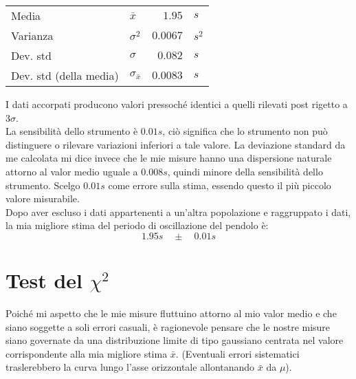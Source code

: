 \documentclass{article}
\begin{document}
	\vspace{0.8cm}
	\begin{table}[H]
		\centering
		\begin{tabular}{llrl}
			Media                       & $\bar{x}$             & $1.95$        & $s$       \\
			Varianza                    & $\sigma ^ 2$          & $0.0067$     & $s^2$  \\
			Dev. std                    & $\sigma$              & $0.082$      & $s$   \\
			Dev. std (della media)      & $\sigma_{\bar{x}}$    & $0.0083$     & $s$    
		\end{tabular}
	\end{table}
	\vspace{0.5cm}
	
	\noindent
	I dati accorpati producono valori pressoché identici a quelli rilevati post rigetto a $3\sigma$. \\
	
	
	\noindent
	La sensibilità dello strumento è $0.01s$, ciò significa che lo strumento non può distinguere o rilevare variazioni inferiori a tale valore. La deviazione standard da me calcolata mi dice invece che le mie misure hanno una dispersione naturale attorno al valor medio uguale a $0.008s$, quindi minore della sensibilità dello strumento. Scelgo $0.01s$ come errore sulla stima, essendo questo il più piccolo valore misurabile. \\
	
	
	\noindent
	Dopo aver escluso i dati appartenenti a un'altra popolazione e raggruppato i dati, la mia migliore stima del  periodo di oscillazione del pendolo è:
	\[
	1.95s \quad \pm \quad 0.01 s
	\]
	
	
	
	
	
	\newpage
	\section{Test del $\chi ^2$}
	Poiché mi aspetto che le mie misure fluttuino attorno al mio valor medio e che siano soggette a soli errori casuali, è ragionevole pensare che le nostre misure siano governate da una distribuzione limite di tipo gaussiano centrata nel valore corrispondente alla mia migliore stima $\bar{x}$. (Eventuali errori sistematici traslerebbero la curva lungo l'asse orizzontale allontanando $\bar{x}$ da $\mu$). \\ 
	
\end{document}
